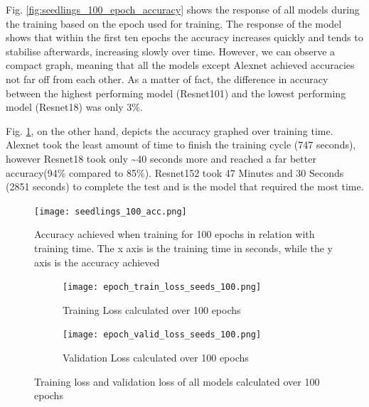 Fig. \ref{fig:seedlings_100_epoch_accuracy} shows the response of all models during the training based on the epoch used for training. The response of the model shows that within the first ten epochs the accuracy increases quickly and tends to stabilise afterwards, increasing slowly over time. However, we can observe a compact graph, meaning that all the models except Alexnet achieved accuracies not far off from each other.
As a matter of fact, the difference in accuracy between the highest performing model (Resnet101) and the lowest performing model (Resnet18) was only 3\%.  


Fig. \ref{fig:seedlings_100_acc}, on the other hand, depicts the accuracy graphed over training time. Alexnet took the least amount of time to finish the training cycle (747 seconds), however Resnet18 took only \textasciitilde40 seconds more and reached a far better accuracy(94\% compared to 85\%). Resnet152 took 47 Minutes and 30 Seconds (2851 seconds) to complete the test and is the model that required the most time. \\
\begin{figure}[h]
       \centering 
	    \texttt{[image: seedlings\_100\_acc.png]}
        \caption[Accuracy achieved when training for 100 epochs in relation with training time]{Accuracy achieved when training for 100 epochs in relation with training time. The x axis is the training time in seconds, while the y axis is the accuracy achieved}
         \label{fig:seedlings_100_acc}
\end{figure}

\begin{figure}[h]
\begin{subfigure}{0.5\textwidth}
	    \texttt{[image: epoch\_train\_loss\_seeds\_100.png]}
	    \caption{Training Loss calculated over 100 epochs}
        \label{fig:train_loss_seeds_100}
     \end{subfigure} \hfill
     \begin{subfigure}{0.5\textwidth}
	    \texttt{[image: epoch\_valid\_loss\_seeds\_100.png]}
	    \caption{Validation Loss calculated over 100 epochs}
         \label{fig:valid_loss_seeds_100}
     \end{subfigure}
     
     \caption{Training loss and validation loss of all models calculated over 100 epochs}
        \label{fig:tran_valid_loss_seeds_100}
        
      
\end{figure}

